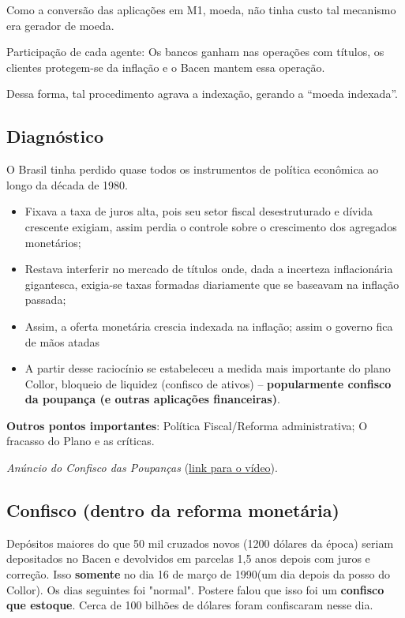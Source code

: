 \documentclass[a4paper,12pt]{article}[abntex2]
\begin{document}
Como a conversão das aplicações em M1, moeda, não tinha custo tal mecanismo era gerador de moeda.

Participação de cada agente: Os bancos ganham nas operações com títulos, os clientes protegem-se da inflação e o Bacen mantem essa operação.

Dessa forma, tal procedimento agrava a indexação, gerando a “moeda indexada”.

\subsection{\textbf{Diagnóstico}}
O Brasil tinha perdido quase todos os instrumentos de política econômica ao longo da década de 1980.

\begin{itemize}
    \item Fixava a taxa de juros alta, pois seu setor fiscal desestruturado e dívida crescente exigiam, assim perdia o controle sobre o crescimento dos agregados monetários;
    \item Restava interferir no mercado de títulos onde, dada a incerteza inflacionária gigantesca, exigia-se taxas formadas diariamente que se baseavam na inflação passada;
    \item Assim, a oferta monetária crescia indexada na inflação; assim o governo fica de mãos atadas
    \item A partir desse raciocínio se estabeleceu a medida mais importante do plano Collor, bloqueio de liquidez (confisco de ativos) –\textbf{ popularmente confisco da poupança (e outras aplicações financeiras)}.
\end{itemize}

\textbf{Outros pontos importantes}: Política Fiscal/Reforma administrativa; O fracasso do Plano e as críticas.

\textit{Anúncio do Confisco das Poupanças} (\href{https://www.youtube.com/watch?v=7KhZa2R-C-E}{link para o vídeo}).

\subsection{\textbf{Confisco (dentro da reforma monetária)}}
Depósitos maiores do que 50 mil cruzados novos (1200 dólares da época) seriam depositados no Bacen e devolvidos em parcelas 1,5 anos depois com juros e correção. Isso \textbf{somente} no dia 16 de março de 1990(um dia depois da posso do Collor). Os dias seguintes foi "normal". Postere falou que isso foi um \textbf{confisco que estoque}. Cerca de 100 bilhões de dólares foram confiscaram nesse dia. 
\end{document}
